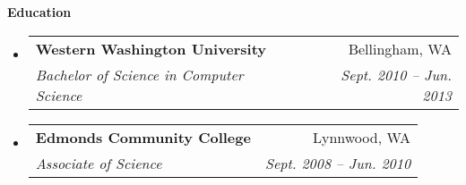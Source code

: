 \documentclass[letterpaper,11pt]{article}
\makeatletter
\newcommand{\resheading}[1]{{\large \colorbox{mygrey}{\begin{minipage}{\textwidth}{\textbf{#1 \vphantom{p\^{E}}}}\end{minipage}}}}
\newcommand{\ressubheading}[4]{
\begin{tabular*}{6.5in}{l@{\extracolsep{\fill}}r}
		\textbf{#1} & #2 \\
		\textit{#3} & \textit{#4} \\
\end{tabular*}\vspace{-6pt}}
\makeatother
\begin{document}
\resheading{Education}
	\begin{itemize}
		\item
			\ressubheading{{Western Washington University}}{Bellingham, WA}{{Bachelor of Science in Computer Science}}{Sept. 2010 -- Jun. 2013}
			
		\item
			\ressubheading{{Edmonds Community College}}{Lynnwood, WA}{{Associate of Science}}{Sept. 2008 -- Jun. 2010}

	\end{itemize} %
\end{document}
